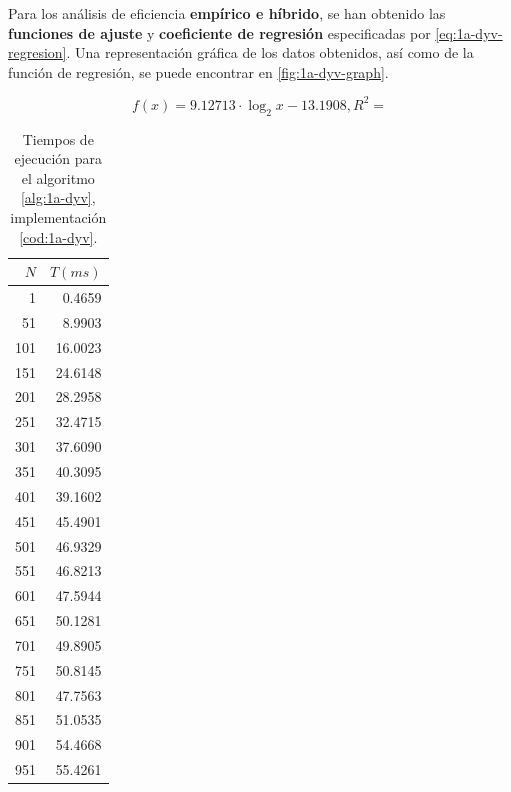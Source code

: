 Para los análisis de eficiencia \textbf{empírico e híbrido}, se han obtenido las \textbf{funciones de ajuste}
y \textbf{coeficiente de regresión} especificadas por \ref{eq:1a-dyv-regresion}. Una representación
gráfica de los datos obtenidos, así como de la función de regresión, se puede encontrar en \ref{fig:1a-dyv-graph}.

\begin{equation}
    \boxed{f(x) = 9.12713 \cdot \log_{2}{x} - 13.1908 , R^2 = }
    \label{eq:1a-dyv-regresion}
\end{equation}

\begin{table}
	\footnotesize
	\centering
	\begin{tabular}{|r|r|}
		\hline
		$N$ & $T (ms)$ \\
		\hline
		1 & 0.4659 \\ 
		51 & 8.9903 \\ 
		101 & 16.0023 \\ 
		151 & 24.6148 \\ 
		201 & 28.2958 \\ 
		251 & 32.4715 \\ 
		301 & 37.6090 \\ 
		351 & 40.3095 \\ 
		401 & 39.1602 \\ 
		451 & 45.4901 \\ 
		501 & 46.9329 \\ 
		551 & 46.8213 \\ 
		601 & 47.5944 \\ 
		651 & 50.1281 \\ 
		701 & 49.8905 \\ 
		751 & 50.8145 \\ 
		801 & 47.7563 \\ 
		851 & 51.0535 \\ 
		901 & 54.4668 \\ 
		951 & 55.4261 \\ 
		\hline
	\end{tabular}

    \caption{Tiempos de ejecución para el algoritmo \ref{alg:1a-dyv}, implementación \ref{cod:1a-dyv}.}
    \label{tab:1a-dyv}
\end{table}

